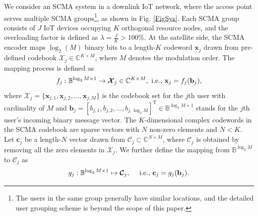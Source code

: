 \documentclass[journal]{IEEEtran}
\begin{document}
 
 We consider an  SCMA system in  a  downlink IoT   network,  where the  access point  serves multiple SCMA   groups\footnote{ The users in the same group generally have similar locations, and the detailed user grouping  scheme is beyond the scope of this paper.}, as shown in Fig. \ref{FigSys}.    Each   SCMA   group consists of  $J$ IoT    devices  occupying $K$ orthogonal  resource nodes, and the overloading factor is defined   as $ \lambda = \frac{J}{K}> 100\% $.   At  the satellite side,  the SCMA encoder maps $\log_2\left(M\right)$   binary bits to a length-$K$ codeword $ \mathbf {x} _{j}$ drawn from pre-defined codebook $ \boldsymbol {\mathcal {X}}_{j}  \in \mathbb {C}^{K \times M}$, where $M$ denotes  the modulation order.  The mapping process is defined as  
\begin{equation} \label{scmamap}
 \small
 f_j:\mathbb{B}^{\log_2M \times 1}  \rightarrow { \boldsymbol {\mathcal X}}_{j}   \in \mathbb {C}^{K \times M}, {~\text {i.e., }}\mathbf {x}_{j}=f_{j}(\mathbf {b}_{j}), 
\end{equation}
  where $ \boldsymbol {\mathcal {X}}_{j}=\{\mathbf{x}_{j,1}, \mathbf{x}_{j,2},\ldots,\mathbf{x}_{j,M}\} $  is the codebook set for the $j$th user with cardinality of $M$ and  $\mathbf {b}_{j}=[b_{j,1},b_{j,2},\ldots,b_{j,\log _{2} M}]^{\text{T}}\in \mathbb{B}^{\log _{2} M \times 1}  $ stands for the $j$th user's incoming    binary message vector. 
The $K$-dimensional complex codewords in the SCMA codebook are sparse vectors with $N$ non-zero elements and $N < K$. %
Let $\mathbf {c}_{j}$ be a length-$N$ vector drawn from  $ \boldsymbol{ {\mathcal C}}_{j}\subset \mathbb {C}^{N \times M }$, where $   \boldsymbol{{\mathcal C}}_{j}$ is obtained  by removing all the zero elements  in  $ \boldsymbol{{ \mathcal X}}_{j}$.  We further define the mapping from $\mathbb{B}^{\log_2M}$ to  $ \boldsymbol{{\mathcal C}}_{j}$ as \cite{luo2022novel}
\begin{equation} \label{SCMAmapping}
 \small
g_{j}:\mathbb {B}^{\log _{2}M\times 1}\mapsto  \boldsymbol{{\mathcal C}}_{j}, \quad {~\text {i.e., }}\mathbf {c}_{j}=g_{j}(\mathbf {b}_{j}).
\end{equation}
\end{document}
